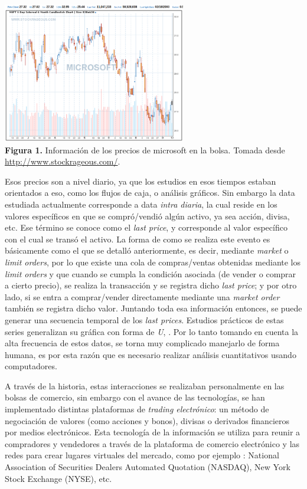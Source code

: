 \begin{center}
	\includegraphics[width=0.6\textwidth]{images/microsoft} \\
	\textbf{Figura 1.} Información de los precios de microsoft en la bolsa. Tomada desde \url{http://www.stockrageous.com/}.
\end{center}

Esos precios son a nivel diario, ya que los estudios en esos tiempos estaban orientados a eso, como los flujos de caja, o análisis gráficos.
Sin embargo la data estudiada actualmente corresponde a data \emph{intra diaria}, la cual reside en los valores
específicos en que se compró/vendió algún activo, ya sea acción, divisa, etc. Ese término se conoce como el \emph{last price}, y corresponde
al valor específico con el cual se transó el activo. La forma de como se realiza este evento es básicamente como el que se detalló anteriormente,
es decir, mediante \emph{market} o \emph{limit orders}, por lo que existe una cola de compras/ventas obtenidas mediante los \emph{limit orders} y que cuando
se cumpla la condición asociada (de vender o comprar a cierto precio), se realiza la transacción y se registra dicho \emph{last price}; 
y por otro lado, si se entra a comprar/vender directamente mediante una \emph{market order} también se registra dicho valor. Juntando toda esa información 
entonces, se puede generar una secuencia temporal de los \emph{last prices}. Estudios prácticos de estas series generalizan su gráfica con forma de \emph{U},
\cite{biais2012empirical}. Por lo tanto tomando en cuenta la alta frecuencia de estos datos, se torna muy complicado manejarlo de forma humana, es por esta 
razón que es necesario realizar análisis cuantitativos usando computadores.

A través de la historia, estas interacciones se realizaban personalmente en las bolsas de comercio, sin embargo con el avance de las tecnologías,
se han implementado distintas plataformas de \emph{trading electrónico}: un método de negociación de valores (como acciones y bonos), divisas o derivados 
financieros por medios electrónicos. Esta tecnología de la información se utiliza para reunir a compradores y vendedores a través de la plataforma de 
comercio electrónico y las redes para crear lugares virtuales del mercado, como por ejemplo \cite{weston2002electronic}: National Association of Securities Dealers Automated 
Quotation (NASDAQ), New York Stock Exchange (NYSE), etc. 

